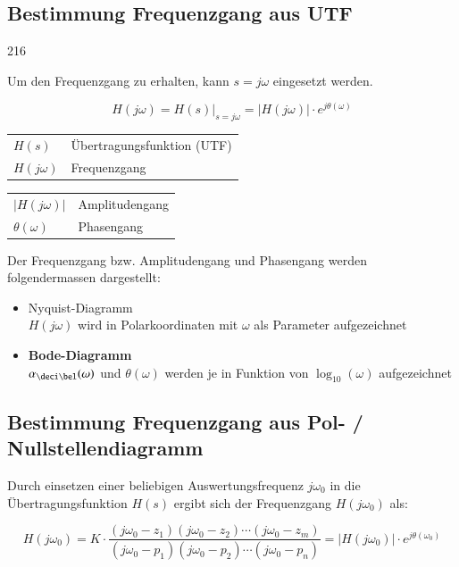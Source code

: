 \subsection{Bestimmung Frequenzgang aus UTF}{216}

Um den Frequenzgang zu erhalten, kann $s = j \omega$ eingesetzt werden.

$$ \boxed{ H(j \omega) = H(s) \Big|_{s = j \omega} = |H(j \omega)| \cdot e^{j \theta(\omega)} } $$

\begin{center}
    \begin{tabular}{ll}
        $H(s)$              & Übertragungsfunktion (UTF) \\
        $H(j \omega)$       & Frequenzgang 
    \end{tabular}\hspace{5mm}
    \begin{tabular}{ll}
        $|H(j \omega)|$     & Amplitudengang \\
        $\theta(\omega)$    & Phasengang
    \end{tabular}
\end{center}

Der Frequenzgang bzw. Amplitudengang und Phasengang werden folgendermassen dargestellt:

\begin{itemize}
    \item Nyquist-Diagramm \\
        $H(j \omega)$ wird in Polarkoordinaten mit $\omega$ als Parameter aufgezeichnet 
    \item \textbf{Bode-Diagramm} \\
        $\alpha_{\deci \bel}(\omega)$ und $\theta(\omega)$ werden je in Funktion von $\log_{10}(\omega)$ aufgezeichnet
\end{itemize}


\subsection{Bestimmung Frequenzgang aus Pol- / Nullstellendiagramm}

Durch einsetzen einer beliebigen Auswertungsfrequenz $j \omega_0$ in die Übertragungsfunktion $H(s)$ ergibt sich der
Frequenzgang $H(j \omega_0)$ als:

$$ H(j \omega_0) = K \cdot \frac{(j \omega_0 - z_1) (j \omega_0 - z_2) \cdots (j \omega_0 - z_m)}
                                {(j \omega_0 - p_1) (j \omega_0 - p_2) \cdots (j \omega_0 - p_n)}
                                = | H(j \omega_0) | \cdot e^{j \theta (\omega_0)} $$

